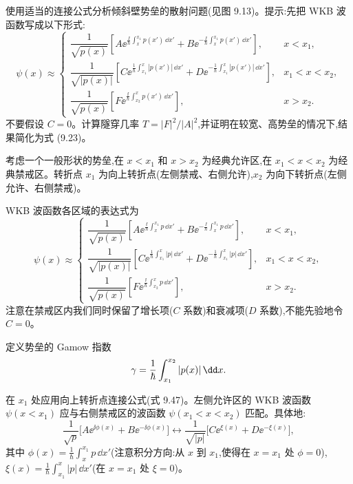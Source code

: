 \begin{question}
使用适当的连接公式分析倾斜壁势垒的散射问题(见图 9.13)。提示:先把 WKB 波函数写成以下形式:
\[
\psi(x)\approx
\begin{cases}
\dfrac{1}{\sqrt{p(x)}}\left[A\ee^{\frac{\ii}{\hbar}\int_x^{x_1}p(x')\,\dd x'}+B\ee^{-\frac{\ii}{\hbar}\int_x^{x_1}p(x')\,\dd x'}\right], & x<x_1,\\[1.1em]
\dfrac{1}{\sqrt{|p(x)|}}\left[C\ee^{\frac{1}{\hbar}\int_{x_1}^x|p(x')|\,\dd x'}+D\ee^{-\frac{1}{\hbar}\int_{x_1}^x|p(x')|\,\dd x'}\right], & x_1<x<x_2,\\[1.1em]
\dfrac{1}{\sqrt{p(x)}}\left[F\ee^{\frac{\ii}{\hbar}\int_{x_2}^x p(x')\,\dd x'}\right], & x>x_2.
\end{cases}
\]
不要假设 $C=0$。计算隧穿几率 $T=|F|^2/|A|^2$,并证明在较宽、高势垒的情况下,结果简化为式 (9.23)。

\par\smallskip
{}

\begin{solution}
考虑一个一般形状的势垒,在 $x<x_1$ 和 $x>x_2$ 为经典允许区,在 $x_1<x<x_2$ 为经典禁戒区。转折点 $x_1$ 为向上转折点(左侧禁戒、右侧允许),$x_2$ 为向下转折点(左侧允许、右侧禁戒)。

WKB 波函数各区域的表达式为
\[
\psi(x)\approx
\begin{cases}
\dfrac{1}{\sqrt{p(x)}}\left[A\ee^{\frac{\ii}{\hbar}\int_x^{x_1}p\,\dd x'}+B\ee^{-\frac{\ii}{\hbar}\int_x^{x_1}p\,\dd x'}\right], & x<x_1,\\[1.2em]
\dfrac{1}{\sqrt{|p(x)|}}\left[C\ee^{\frac{1}{\hbar}\int_{x_1}^x|p|\,\dd x'}+D\ee^{-\frac{1}{\hbar}\int_{x_1}^x|p|\,\dd x'}\right], & x_1<x<x_2,\\[1.2em]
\dfrac{1}{\sqrt{p(x)}}\left[F\ee^{\frac{\ii}{\hbar}\int_{x_2}^x p\,\dd x'}\right], & x>x_2.
\end{cases}
\]
注意在禁戒区内我们同时保留了增长项($C$ 系数)和衰减项($D$ 系数),不能先验地令 $C=0$。

定义势垒的 Gamow 指数
\[
\gamma={1\over\hbar}\int_{x_1}^{x_2}|p(x)|\,\dd x.
\]

在 $x_1$ 处应用向上转折点连接公式(式 9.47)。左侧允许区的 WKB 波函数 $\psi(x<x_1)$ 应与右侧禁戒区的波函数 $\psi(x_1<x<x_2)$ 匹配。具体地:
\[
\frac{1}{\sqrt{p}}\bigl[A\ee^{\ii\phi(x)}+B\ee^{-\ii\phi(x)}\bigr]
\longleftrightarrow
\frac{1}{\sqrt{|p|}}\bigl[C\ee^{\xi(x)}+D\ee^{-\xi(x)}\bigr],
\]
其中 $\phi(x)=\frac1\hbar\int_x^{x_1}p\,\dd x'$(注意积分方向:从 $x$ 到 $x_1$,使得在 $x=x_1$ 处 $\phi=0$),$\xi(x)=\frac1\hbar\int_{x_1}^x|p|\,\dd x'$(在 $x=x_1$ 处 $\xi=0$)。


\end{solution}
\end{question}

